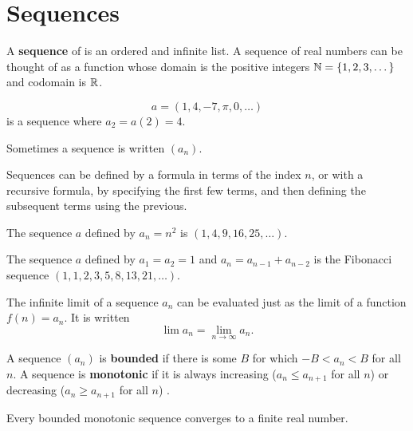 \section{Sequences}
\label{sec:sequences}

A \textbf{sequence} of is an ordered and infinite list. A sequence of real numbers can be thought of as a function whose domain is the positive integers $\mathbb{N}=\{1,2,3,\dots\}$ and codomain is $\mathbb{R}$.
\begin{exampleblock}
$$a=(1,4,-7,\pi,0,\dots)$$
is a sequence where $a_2=a(2)=4$.
\end{exampleblock}
Sometimes a sequence is written $(a_n)$.

Sequences can be defined by a formula in terms of the index $n$, or with a recursive formula, by specifying the first few terms, and then defining the subsequent terms using the previous.

\begin{exampleblock}
The sequence $a$ defined by $a_n=n^2$ is $(1,4,9,16,25,\dots)$.
\end{exampleblock}

\begin{exampleblock}
The sequence $a$ defined by $a_1=a_2=1$ and $a_n=a_{n-1}+a_{n-2}$ is the Fibonacci sequence $(1,1,2,3,5,8,13,21,\dots)$.
\end{exampleblock}

The infinite limit of a sequence $a_n$ can be evaluated just as the limit of a function $f(n)=a_n$. It is written
$$\lim a_n = \lim_{n\to\infty} a_n.$$

A sequence $(a_n)$ is \textbf{bounded} if there is some $B$ for which $-B<a_n<B$ for all $n$. A sequence is \textbf{monotonic} if it is always increasing ($a_n\leq a_{n+1}$ for all $n$)  or decreasing ($a_n\geq a_{n+1}$ for all $n$) .

\begin{thm}
Every bounded monotonic sequence converges to a finite real number.
\end{thm}
